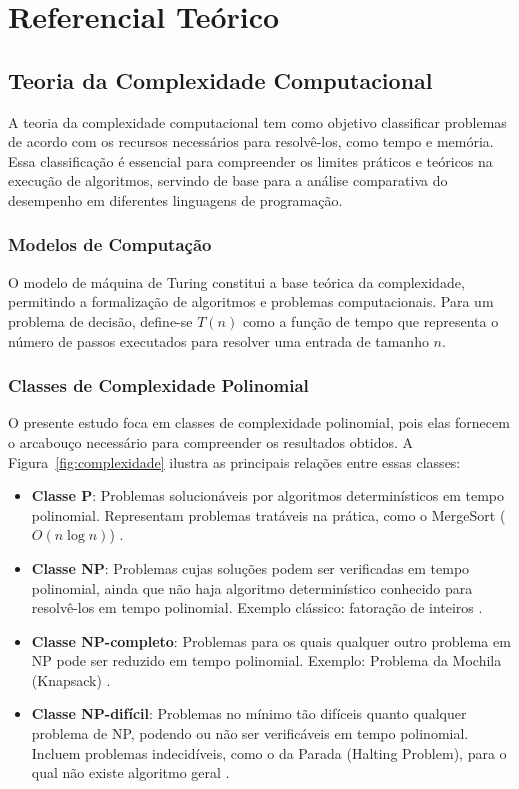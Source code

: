 \documentclass[12pt, a4paper]{article}
\begin{document}
\section{Referencial Teórico}

\subsection{Teoria da Complexidade Computacional}

A teoria da complexidade computacional tem como objetivo classificar problemas de acordo com os recursos necessários para resolvê-los, como tempo e memória. Essa classificação é essencial para compreender os limites práticos e teóricos na execução de algoritmos, servindo de base para a análise comparativa do desempenho em diferentes linguagens de programação.  

\subsubsection{Modelos de Computação}

O modelo de máquina de Turing constitui a base teórica da complexidade, permitindo a formalização de algoritmos e problemas computacionais. Para um problema de decisão, define-se \( T(n) \) como a função de tempo que representa o número de passos executados para resolver uma entrada de tamanho \( n \).

\subsubsection{Classes de Complexidade Polinomial}

O presente estudo foca em classes de complexidade polinomial, pois elas fornecem o arcabouço necessário para compreender os resultados obtidos. A Figura~\ref{fig:complexidade} ilustra as principais relações entre essas classes:

\begin{itemize}
    \item \textbf{Classe P}: Problemas solucionáveis por algoritmos determinísticos em tempo polinomial. Representam problemas tratáveis na prática, como o MergeSort (\( O(n \log n) \)) .
    
    \item \textbf{Classe NP}: Problemas cujas soluções podem ser verificadas em tempo polinomial, ainda que não haja algoritmo determinístico conhecido para resolvê-los em tempo polinomial. Exemplo clássico: fatoração de inteiros .
    
    \item \textbf{Classe NP-completo}: Problemas para os quais qualquer outro problema em NP pode ser reduzido em tempo polinomial. Exemplo: Problema da Mochila (Knapsack) .
    
    \item \textbf{Classe NP-difícil}: Problemas no mínimo tão difíceis quanto qualquer problema de NP, podendo ou não ser verificáveis em tempo polinomial. Incluem problemas indecidíveis, como o da Parada (Halting Problem), para o qual não existe algoritmo geral .
\end{itemize}
\end{document}
